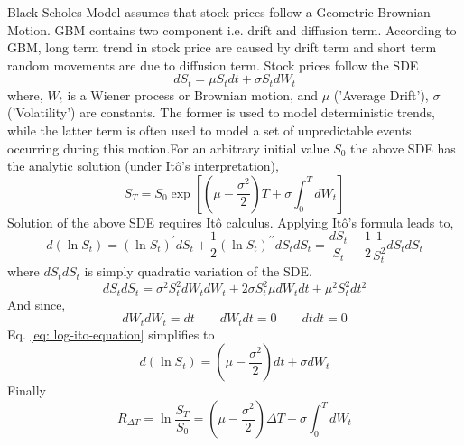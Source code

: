 \documentclass[paper.tex]{subfiles}
\begin{document}
    Black Scholes Model assumes that stock prices follow a Geometric Brownian Motion.
    GBM contains two component i.e. drift and diffusion term.
    According to GBM, long term trend in stock price are caused by drift term and short term random movements are due to diffusion term.
    Stock prices follow the SDE
    \begin{equation}
        dS_{t}=\mu S_{t} dt+\sigma S_{t} dW_{t}
        \label{eq: gbm-sde}
    \end{equation}
    where, $W_{t}$ is a Wiener process or Brownian motion, and $ \mu $ ('Average Drift'), $ \sigma $ ('Volatility') are constants.
    The former is used to model deterministic trends, while the latter term is often used to model a set of unpredictable events occurring during this motion.For an arbitrary initial value $S_{0}$ the above SDE has the analytic solution (under Itô's interpretation),
    \begin{equation}
        S_{T} = S_{0} \exp \left[ \left( \mu - \dfrac{\sigma^{2}}{2}\right) T + \sigma \int_{0}^{T}dW_{t} \right]
        \label{eq: gbm-equation}
    \end{equation}
    Solution of the above SDE requires Itô calculus. Applying Itô's formula leads to,
    \begin{equation}
        d(\ln S_{t}) = \left( \ln S_{t} \right)^{\prime} dS_{t} + \dfrac{1}{2} \left( \ln S_{t} \right)^{\prime \prime} dS_{t} dS_{t} = \dfrac{dS_{t}}{S_{t}} - \dfrac{1}{2} \dfrac{1}{S_{t}^{2}} dS_{t} dS_{t}
        \label{eq: log-ito-equation}
    \end{equation}
    where $dS_{t} dS_{t}$ is simply quadratic variation of the SDE.
    $$ dS_{t} dS_{t} = \sigma^{2} S_{t}^{2} dW_{t} dW_{t} + 2 \sigma S_{t}^{2} \mu dW_{t} dt + \mu^{2} S_{t}^{2} dt^{2} $$
    And since,
    $$  dW_{t} dW_{t} = dt ~~~~~~~~~  dW_{t} dt = 0 ~~~~~~~~~  dt dt = 0  $$
    Eq. \ref{eq: log-ito-equation} simplifies to
    \begin{equation}
        d(\ln S_{t}) = \left( \mu - \dfrac{\sigma^{2}}{2} \right) dt + \sigma dW_{t}
        \label{eq: log-ito-2}
    \end{equation}
    Finally
    \begin{equation}
        R_{\Delta T} = \ln \dfrac{S_{T}}{S_{0}} = \left( \mu - \dfrac{\sigma^{2}}{2}\right) \Delta T + \sigma \int_{0}^{T}dW_{t}
    \end{equation}
\end{document}
